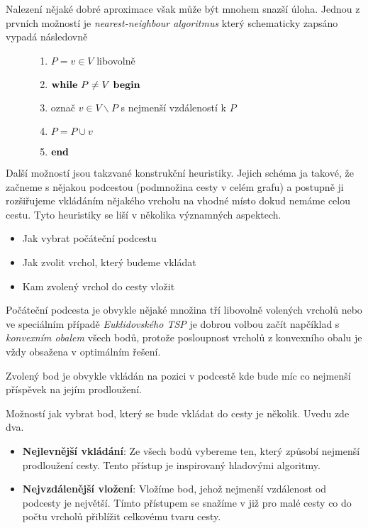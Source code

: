 \documentclass[11pt,twocolumn,a4paper]{article}
\begin{document}
Nalezení nějaké dobré aproximace však může být mnohem snazší úloha. Jednou z prvních možností je \emph{nearest-neighbour algoritmus} který schematicky zapsáno vypadá následovně
\begin{figure}[h]
\begin{enumerate}
\item $P = v \in V$ libovolně
\item $\bold{while} \ P \neq V \ \bold{begin}$
\item označ $v \in V \backslash P$ s nejmenší vzdáleností k $P$
\item $P = P \cup v$
\item $\bold{end}$
\end{enumerate}
\end{figure}


Další možností jsou takzvané konstrukční heuristiky. Jejich schéma ja takové, že začneme s nějakou podcestou (podmnožina cesty v celém grafu) a postupně ji rozšiřujeme vkládáním nějakého vrcholu na vhodné místo dokud nemáme celou cestu. Tyto heuristiky se liší v několika významných aspektech.
\begin{itemize}
\item Jak vybrat počáteční podcestu
\item Jak zvolit vrchol, který budeme vkládat
\item Kam zvolený vrchol do cesty vložit
\end{itemize}

Počáteční podcesta je obvykle nějaké množina tří libovolně volených vrcholů nebo ve speciálním případě \emph{Euklidovského TSP} je dobrou volbou začít napčíklad s \emph{konvexním obalem} všech bodů, protože posloupnost vrcholů z konvexního obalu je vždy obsažena v optimálním řešení.

Zvolený bod je obvykle vkládán na pozici v podcestě kde bude míc co nejmenší příspěvek na jejím prodloužení.

Možností jak vybrat bod, který se bude vkládat do cesty je několik. Uvedu zde dva.
\begin{itemize}
\item \textbf{Nejlevnější vkládání}: Ze všech bodů vybereme ten, který způsobí nejmenší prodloužení cesty. Tento přístup je inspirovaný hladovými algoritmy.
\item \textbf{Nejvzdálenější vložení}: Vložíme bod, jehož nejmenší vzdálenost od podcesty je největší. Tímto přístupem se snažíme v již pro malé cesty co do počtu vrcholů přiblížit celkovému tvaru cesty.
\end{itemize}
\end{document}
